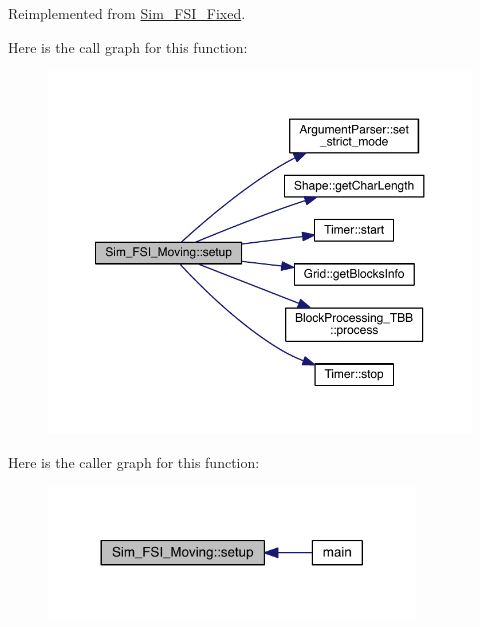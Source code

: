 Reimplemented from \hyperlink{class_sim___f_s_i___fixed_a9da9f0d775b05a9a9c77003914af307c}{Sim\+\_\+\+F\+S\+I\+\_\+\+Fixed}.



Here is the call graph for this function\+:\nopagebreak
\begin{figure}[H]
\begin{center}
\leavevmode
\includegraphics[width=350pt]{db/df6/class_sim___f_s_i___moving_a0e8ff3c8d37dfa22c3d696c526a14ad8_cgraph}
\end{center}
\end{figure}




Here is the caller graph for this function\+:\nopagebreak
\begin{figure}[H]
\begin{center}
\leavevmode
\includegraphics[width=276pt]{db/df6/class_sim___f_s_i___moving_a0e8ff3c8d37dfa22c3d696c526a14ad8_icgraph}
\end{center}
\end{figure}


\hypertarget{class_sim___f_s_i___moving_ae20d894ac95fb1e13de88147a8bc1b3e}{}

